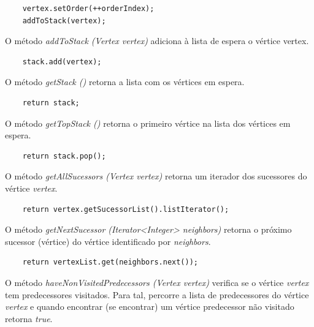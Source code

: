 \documentclass[a4paper,10pt]{report}
\begin{document}
\begin{lstlisting}
    vertex.setOrder(++orderIndex);
    addToStack(vertex);    
\end{lstlisting}

O método \textit{addToStack (Vertex vertex)} adiciona à lista de espera o vértice vertex.

\begin{lstlisting}  
    stack.add(vertex);
\end{lstlisting}    

O método \textit{getStack ()} retorna a lista com os vértices em espera.

\begin{lstlisting}
    return stack;
\end{lstlisting}

O método \textit{getTopStack ()} retorna o primeiro vértice na lista dos vértices em espera.

\begin{lstlisting}
    return stack.pop();
\end{lstlisting}

O método \textit{getAllSucessors (Vertex vertex)} retorna um iterador dos sucessores do vértice \textit{vertex}.

\begin{lstlisting}
    return vertex.getSucessorList().listIterator();
\end{lstlisting}

O método \textit{getNextSucessor (Iterator<Integer> neighbors)} retorna o próximo sucessor (vértice) do vértice identificado por \textit{neighbors}.

\begin{lstlisting}
    return vertexList.get(neighbors.next());    
\end{lstlisting}

O método \textit{haveNonVisitedPredecessors (Vertex vertex)} verifica se o vértice \textit{vertex} tem predecessores visitados. Para tal, percorre a lista de predecessores do vértice \textit{vertex} e quando encontrar (se encontrar) um vértice predecessor não visitado retorna \textit{true}.
\end{document}
